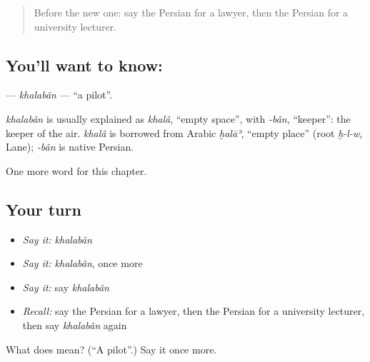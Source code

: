 \label{lesson:FA-C250-khalaban}



\begin{quote}
Before the new one: say the Persian for a lawyer, then the Persian for a university lecturer.
\end{quote}

\subsection*{You'll want to know: }
\textbf{} — \emph{khalabân} — \textquotedblleft{}a pilot\textquotedblright{}.

\begin{cousinweb}
\emph{khalabân} is usually explained as \emph{khalâ}, \textquotedblleft{}empty space\textquotedblright{}, with \emph{-bân}, \textquotedblleft{}keeper\textquotedblright{}: the keeper of the air. \emph{khalâ} is borrowed from Arabic \emph{ḫalāʾ}, \textquotedblleft{}empty place\textquotedblright{} (root \emph{ḫ-l-w}, Lane); \emph{-bân} is native Persian.
\end{cousinweb}

\begin{grammarlens}[title={What you've built}]
One more word for this chapter.
\end{grammarlens}

\subsection*{Your turn}
\begin{itemize}
\raggedright
  \item \emph{Say it:} \emph{khalabân}
  \item \emph{Say it:} \emph{khalabân}, once more
  \item \emph{Say it:} say \emph{khalabân}
  \item \emph{Recall:} say the Persian for a lawyer, then the Persian for a university lecturer, then say \emph{khalabân} again
\end{itemize}

\begin{tcolorbox}[breakable,colback=teal!4,colframe=teal!35!black,title={Before you move on}]
What does  mean? (\textquotedblleft{}A pilot\textquotedblright{}.) Say it once more.
\end{tcolorbox}

